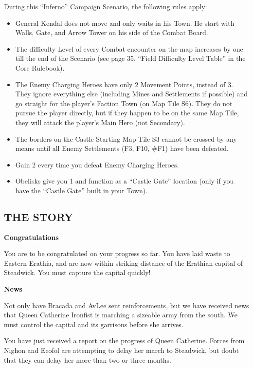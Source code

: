 \begin{multicols*}{2}
During this ``Inferno'' Campaign Scenario, the following rules apply:

\begin{itemize}
    \item General Kendal does not move and only waits in his Town. He start with Walls, Gate,
      and Arrow Tower on his side of the Combat Board.
    \item The difficulty Level of every Combat encounter on the map increases by one till the end of the Scenario
      (see page 35, ``Field Difficulty Level Table'' in the Core Rulebook).
    \item The Enemy Charging Heroes have only 2 Movement Points, instead of 3. They ignore everything else
      (including Mines and Settlements if possible) and go straight for the player's Faction Town (on Map Tile S6).
      They do not pursue the player directly, but if they happen to be on the same Map Tile, they will
      attack the player's Main Hero (not Secondary).
    \item The borders on the Castle Starting Map Tile S3 cannot be crossed by any means until
      all Enemy Settlements (F3, F10, \#F1) have been defeated.
    \item Gain 2  every time you defeat Enemy Charging Heroes.
    \item Obelisks give you 1  and function as a ``Castle Gate'' location (only if you have the ``Castle Gate'' built in your Town).
\end{itemize}

\subsection*{\MakeUppercase{The Story}}

\textbf{Congratulations}

You are to be congratulated on your progress so far.
You have laid waste to Eastern Erathia, and are now within striking distance of the Erathian capital of Steadwick.
You must capture the capital quickly!

\textbf{News}

Not only have Bracada and AvLee sent reinforcements, but we have received news that Queen Catherine Ironfist is marching a sizeable army from the south.
We must control the capital and its garrisons before she arrives.

You have just received a report on the progress of Queen Catherine.
Forces from Nighon and Eeofol are attempting to delay her march to Steadwick, but doubt that they can delay her more than two or three months.


\end{multicols*}

